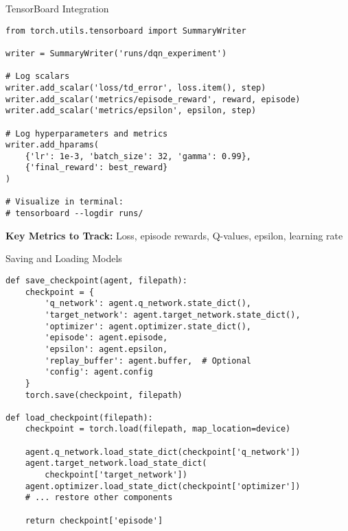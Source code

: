 \documentclass[aspectratio=169,10pt]{beamer}
\begin{document}
\begin{frame}[fragile]{TensorBoard Integration}
\begin{lstlisting}
from torch.utils.tensorboard import SummaryWriter

writer = SummaryWriter('runs/dqn_experiment')

# Log scalars
writer.add_scalar('loss/td_error', loss.item(), step)
writer.add_scalar('metrics/episode_reward', reward, episode)
writer.add_scalar('metrics/epsilon', epsilon, step)

# Log hyperparameters and metrics
writer.add_hparams(
    {'lr': 1e-3, 'batch_size': 32, 'gamma': 0.99},
    {'final_reward': best_reward}
)

# Visualize in terminal:
# tensorboard --logdir runs/
\end{lstlisting}

\textbf{Key Metrics to Track:}
Loss, episode rewards, Q-values, epsilon, learning rate
\end{frame}

\begin{frame}[fragile]{Saving and Loading Models}
\begin{lstlisting}
def save_checkpoint(agent, filepath):
    checkpoint = {
        'q_network': agent.q_network.state_dict(),
        'target_network': agent.target_network.state_dict(),
        'optimizer': agent.optimizer.state_dict(),
        'episode': agent.episode,
        'epsilon': agent.epsilon,
        'replay_buffer': agent.buffer,  # Optional
        'config': agent.config
    }
    torch.save(checkpoint, filepath)

def load_checkpoint(filepath):
    checkpoint = torch.load(filepath, map_location=device)
    
    agent.q_network.load_state_dict(checkpoint['q_network'])
    agent.target_network.load_state_dict(
        checkpoint['target_network'])
    agent.optimizer.load_state_dict(checkpoint['optimizer'])
    # ... restore other components
    
    return checkpoint['episode']
\end{lstlisting}
\end{frame}
\end{document}
